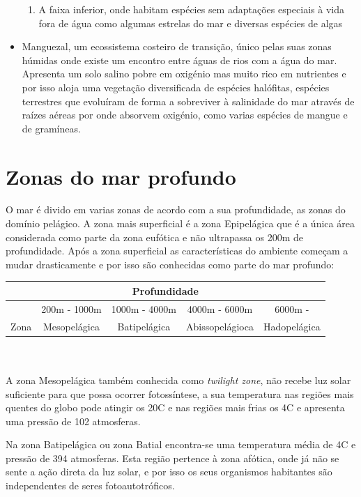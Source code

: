 \documentclass{report}
\begin{document}
\begin{itemize}
\begin{enumerate}
        \item A faixa inferior, onde habitam espécies sem adaptações especiais à vida fora de água como algumas estrelas do mar e diversas espécies de algas
    \end{enumerate}
    \item Manguezal, um ecossistema costeiro de transição, único pelas suas zonas húmidas onde existe um encontro entre águas de rios com a água do mar. Apresenta um solo salino pobre em oxigénio mas muito rico em nutrientes e por isso aloja uma vegetação diversificada de espécies halófitas, espécies terrestres que evoluíram de forma a sobreviver à salinidade do mar através de raízes aéreas por onde absorvem oxigénio, como varias espécies de mangue e de gramíneas.
\end{itemize}

\section{Zonas do mar profundo}
O mar é divido em varias zonas de acordo com a sua profundidade, as zonas do domínio pelágico. A zona mais superficial é a zona Epipelágica que é a única área considerada como parte da zona eufótica e não ultrapassa os 200m de profundidade. Após a zona superficial as características do ambiente começam a mudar drasticamente e por isso são conhecidas como parte do mar profundo:
\\
\begin{tabular}{|c|c|c|c|c|} \hline
    \multicolumn{5}{|c|}{Profundidade} \\ \hline
     & 200m - 1000m  & 1000m - 4000m & 4000m - 6000m& 6000m - \\ \hline
    Zona & Mesopelágica & Batipelágica & Abissopelágioca  & Hadopelágica \\ \hline
\end{tabular}
\\
\\

A zona Mesopelágica também conhecida como \textit{twilight zone}, não recebe luz solar suficiente para que possa ocorrer fotossíntese, a sua temperatura nas regiões mais quentes do globo pode atingir os 20\textordmasculine C e nas regiões mais frias os 4\textordmasculine C e apresenta uma pressão de 102 atmosferas.

Na zona Batipelágica ou zona Batial encontra-se uma temperatura média de 4\textordmasculine C e pressão de 394 atmosferas. Esta região pertence à zona afótica, onde já não se sente a ação direta da luz solar, e por isso os seus organismos habitantes são independentes de seres fotoautotróficos.
\end{document}
